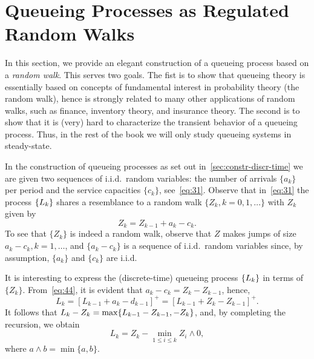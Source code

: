 

\section{Queueing Processes as Regulated Random Walks}
\label{sec:queu-proc-as}


In this section, we provide an elegant construction of a queueing process based on a \emph{random walk}.
This serves two goals.
The fist is to show that queueing theory is essentially based on concepts of fundamental interest in probability theory (the random walk), hence is strongly related to many other applications of random walks, such as finance, inventory theory, and insurance theory.
The second is to show that it is (very) hard to characterize the transient behavior of a queueing process.
Thus, in the rest of the book we will only study queueing systems in steady-state.







In the construction of queueing processes as set out in~\cref{sec:constr-discr-time} we are given two sequences of i.i.d.\ random variables: the number of arrivals $\{a_k\}$ per period and the service capacities $\{c_k\}$, see~\cref{eq:31}.
Observe that in~\cref{eq:31} the process $\{L_k\}$ shares a resemblance to a random walk $\{Z_k, k=0,1,\ldots\}$ with $Z_k$ given by
\begin{equation}\label{eq:44}
 Z_k = Z_{k-1} + a_k - c_k.
\end{equation}
To see that $\{Z_k\}$ is indeed a random walk, observe that $Z$ makes jumps of size $a_k-c_k, k=1,\ldots$, and $\{a_k-c_k\}$ is a sequence of i.i.d.\ random variables since, by assumption, $\{a_k\}$ and $\{c_k\}$ are i.i.d.


It is interesting to express the (discrete-time) queueing process $\{L_k\}$ in terms of $\{Z_k\}$. From~\cref{eq:44}, it is evident that $a_k - c_k = Z_k - Z_{k-1}$, hence,
\begin{equation*}
 L_k = [L_{k-1} +a_k- d_{k-1}]^+ = [L_{k-1} +Z_k- Z_{k-1}]^+.
\end{equation*}
It follows that  $L_k - Z_{k} = \max\{L_{k-1} - Z_{k-1}, -Z_k\}$,
and, by completing the recursion, we obtain 
\begin{equation}\label{eq:reich1}
 L_k = Z_k - \min_{1\leq i \leq k} Z_i\wedge 0,
\end{equation}
where $a\wedge b = \min\{a,b\}$.



